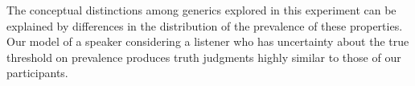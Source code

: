 \documentclass[10pt,letterpaper]{article}
\begin{document}
The conceptual distinctions among generics \cite{Prasada2013} explored in this experiment can be explained by differences in the distribution of the prevalence of these properties. 
Our model of a speaker considering a listener who has uncertainty about the true threshold on prevalence produces truth judgments highly similar to those of our participants.



\end{document}
